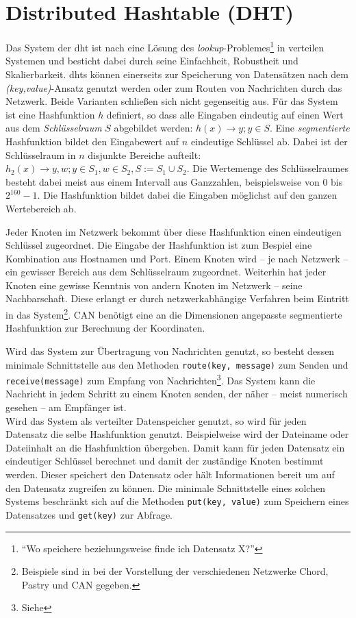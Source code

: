 \chapter{Distributed Hashtable (DHT)}
\label{chap:dht}

Das System der \acf{dht} ist nach \cite{Wehrle2005} eine Lösung des \emph{lookup}-Problemes\footnote{\enquote{Wo speichere beziehungsweise finde ich Datensatz X?}} in verteilen Systemen und besticht dabei durch seine Einfachheit, Robustheit und Skalierbarkeit. \acp{dht} können einerseits zur Speicherung von Datensätzen nach dem \emph{(key,value)}-Ansatz genutzt werden oder zum Routen von Nachrichten durch das Netzwerk. Beide Varianten schließen sich nicht gegenseitig aus. Für das System ist eine Hashfunktion $h$ definiert, so dass alle Eingaben eindeutig auf einen Wert aus dem \emph{Schlüsselraum} $S$ abgebildet werden: $h(x) \rightarrow y; y \in S$. Eine \emph{segmentierte} Hashfunktion bildet den Eingabewert auf $n$ eindeutige Schlüssel ab. Dabei ist der Schlüsselraum in $n$ disjunkte Bereiche aufteilt: $h_2(x) \rightarrow y,w; y \in S_1, w \in S_2, S := S_1 \cup S_2$. Die Wertemenge des Schlüsselraumes besteht dabei meist aus einem Intervall aus Ganzzahlen, beispielsweise von $0$ bis $2^{160}-1$. Die Hashfunktion bildet dabei die Eingaben möglichst auf den ganzen Wertebereich ab.

Jeder Knoten im Netzwerk bekommt über diese Hashfunktion einen eindeutigen Schlüssel zugeordnet. Die Eingabe der Hashfunktion ist zum Bespiel eine Kombination aus Hostnamen und Port. Einem Knoten wird -- je nach Netzwerk -- ein gewisser Bereich aus dem Schlüsselraum zugeordnet. Weiterhin hat jeder Knoten eine gewisse Kenntnis von andern Knoten im Netzwerk -- seine Nachbarschaft. Diese erlangt er durch netzwerkabhängige Verfahren beim Eintritt in das System\footnote{Beispiele sind in  bei der Vorstellung der verschiedenen Netzwerke Chord, Pastry und CAN gegeben.}. CAN benötigt eine an die Dimensionen angepasste segmentierte Hashfunktion zur Berechnung der Koordinaten.

Wird das System zur Übertragung von Nachrichten genutzt, so besteht dessen minimale Schnittstelle aus den Methoden \texttt{route(key, message)} zum Senden und \texttt{receive(message)} zum Empfang von Nachrichten\footnote{Siehe }. Das System kann die Nachricht in jedem Schritt zu einem Knoten senden, der näher -- meist numerisch gesehen -- am Empfänger ist.\\
Wird das System als verteilter Datenspeicher genutzt, so wird für jeden Datensatz die selbe Hashfunktion genutzt. Beispielweise wird der Dateiname oder Dateiinhalt an die Hashfunktion übergeben. Damit kann für jeden Datensatz ein eindeutiger Schlüssel berechnet und damit der zuständige Knoten bestimmt werden. Dieser speichert den Datensatz oder hält Informationen bereit um auf den Datensatz zugreifen zu können. Die minimale Schnittstelle eines solchen Systems beschränkt sich auf die Methoden \texttt{put(key, value)} zum Speichern eines Datensatzes und \texttt{get(key)} zur Abfrage.
